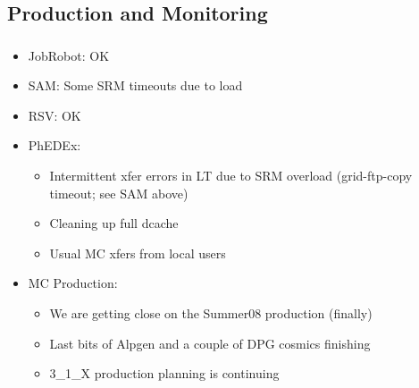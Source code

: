 \documentclass{beamer}
\begin{document}
\subsection{Production and Monitoring}
\begin{frame}
\frametitle{}
\begin{itemize}
     \item JobRobot: OK
     \item SAM: Some SRM timeouts due to load
     \item RSV: OK
     \item PhEDEx:
	 \begin{itemize}
		\item Intermittent xfer errors in LT due to SRM overload (grid-ftp-copy timeout; see SAM above) 
		\item Cleaning up full dcache
		\item Usual MC xfers from local users
	 \end{itemize}
     \item MC Production:
	 \begin{itemize}
		\item We are getting close on the Summer08 production (finally)
		\item Last bits of Alpgen and a couple of DPG cosmics finishing
		\item 3\_1\_X production planning is continuing
	 \end{itemize}
\end{itemize}
\end{frame}
\end{document}
